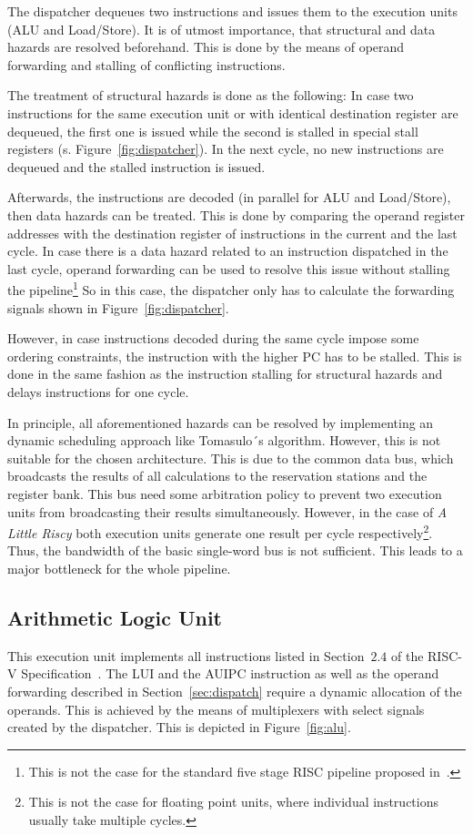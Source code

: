 \documentclass[conference]{IEEEtran}
\begin{document}
The dispatcher dequeues two instructions and issues them to the execution units (ALU and Load/Store). It is of utmost importance, that structural and data hazards are resolved beforehand. This is done by the means of operand forwarding and stalling of conflicting instructions.

The treatment of structural hazards is done as the following: In case two instructions for the same execution unit or with identical destination register are dequeued, the first one is issued while the second is stalled in special stall registers (s. Figure~\ref{fig:dispatcher}). In the next cycle, no new instructions are dequeued and the stalled instruction is issued.

Afterwards, the instructions are decoded (in parallel for ALU and Load/Store), then data hazards can be treated. This is done by comparing the operand register addresses with the destination register of instructions in the current and the last cycle. In case there is a data hazard related to an instruction dispatched in the last cycle, operand forwarding can be used to resolve this issue without stalling the pipeline\footnote{This is not the case for the standard five stage RISC pipeline proposed in~\cite{HP}.} So in this case, the dispatcher only has to calculate the forwarding signals shown in Figure~\ref{fig:dispatcher}.

However, in case instructions decoded during the same cycle impose some ordering constraints, the instruction with the higher PC has to be stalled. This is done in the same fashion as the instruction stalling for structural hazards and delays instructions for one cycle.

In principle, all aforementioned hazards can be resolved by implementing an dynamic scheduling approach like Tomasulo´s algorithm. However, this is not suitable for the chosen architecture. This is due to the common data bus, which broadcasts the results of all calculations to the reservation stations and the register bank. This bus need some arbitration policy to prevent two execution units from broadcasting their results simultaneously. However, in the case of \emph{A Little Riscy} both execution units generate one result per cycle respectively\footnote{This is not the case for floating point units, where individual instructions usually take multiple cycles.}. Thus, the bandwidth of the basic single-word bus is not sufficient. This leads to a major bottleneck for the whole pipeline.

\subsection{Arithmetic Logic Unit}
This execution unit implements all instructions listed in Section~$2.4$ of the RISC-V Specification~\cite{risc-v}. The LUI and the AUIPC instruction as well as the operand forwarding described in Section~\ref{sec:dispatch} require a dynamic allocation of the operands. This is achieved by the means of multiplexers with select signals created by the dispatcher. This is depicted in Figure~\ref{fig:alu}.
\end{document}
